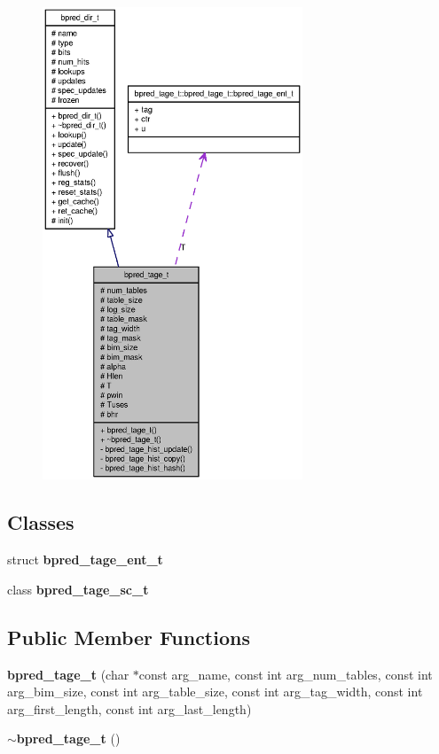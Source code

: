 \begin{figure}[H]
\begin{center}
\leavevmode
\includegraphics[height=400pt]{classbpred__tage__t__coll__graph}
\end{center}
\end{figure}
\subsection*{Classes}
\begin{CompactItemize}
\item 
struct {\bf bpred\_\-tage\_\-ent\_\-t}
\item 
class {\bf bpred\_\-tage\_\-sc\_\-t}
\end{CompactItemize}
\subsection*{Public Member Functions}
\begin{CompactItemize}
\item 
{\bf bpred\_\-tage\_\-t} (char $\ast$const arg\_\-name, const int arg\_\-num\_\-tables, const int arg\_\-bim\_\-size, const int arg\_\-table\_\-size, const int arg\_\-tag\_\-width, const int arg\_\-first\_\-length, const int arg\_\-last\_\-length)
\item 
{\bf $\sim$bpred\_\-tage\_\-t} ()
\end{CompactItemize}
